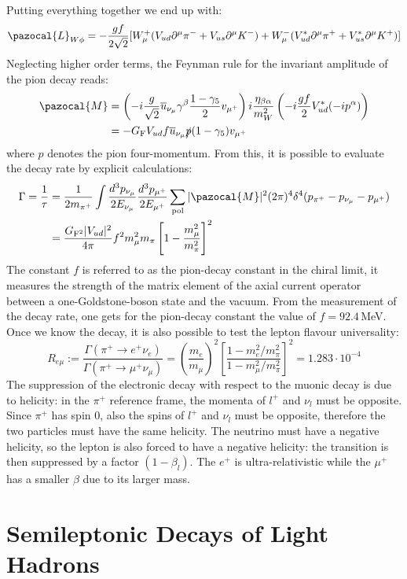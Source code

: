\documentclass[../main.tex]{subfiles}
\begin{document}
Putting everything together we end up with:
\[
\pazocal{L}_{W\phi}=-\frac{gf}{2\sqrt{2}}[W_\mu^+(V_{ud}\partial^\mu\pi^-+V_{us}\partial^\mu K^-)+W_\mu^-(V_{ud}^*\partial^\mu\pi^++V_{us}^*\partial^\mu K^+)]
\]
Neglecting higher order terms, the Feynman rule for the invariant amplitude of the pion decay reads:
\begin{align*}
\pazocal{M}&=\left(-i\frac{g}{\sqrt{2}}\overline{u}_{\nu_\mu}\gamma^\beta\frac{1-\gamma_5}{2}v_{\mu^+}\right)i\frac{\eta_{\beta\alpha}}{m_W^2}\left(-i\frac{gf}{2}V_{ud}^*(-ip^\alpha)\right)\\
&=-G_{\text{F}}V_{ud}f\overline{u}_{\nu_\mu}\slashed{p}(1-\gamma_5)v_{\mu^+}
\end{align*}
where $p$ denotes the pion four-momentum.
From this, it is possible to evaluate the decay rate by explicit calculations:
\begin{align*}
\Gamma=\frac{1}{\tau}&=\frac{1}{2m_{\pi^+}}\int\frac{d^3p_{\nu_\mu}}{2E_{\nu_\mu}}\frac{d^3p_{\mu^+}}{2E_{\mu^+}}\sum_{\text{pol}}|\pazocal{M}|^2(2\pi)^4\delta^4(p_{\pi^+}-p_{\nu_\mu}-p_{\mu^+})\\
&=\frac{G_{\text{F}^2}|V_{ud}|^2}{4\pi}f^2m_\mu^2m_\pi\left[1-\frac{m_\mu^2}{m_\pi^2}\right]^2
\end{align*}
The constant $f$ is referred to as the pion-decay constant in the chiral limit, it measures the strength of the matrix element of the axial current
operator between a one-Goldstone-boson state and the vacuum. From the measurement of the decay rate, one gets for the pion-decay constant the value of $f=92.4$\,MeV.
Once we know the decay, it is also possible to test the lepton flavour universality:
\[
R_{e\mu}:=\frac{\Gamma(\pi^+\to e^+\nu_e)}{\Gamma(\pi^+\to\mu^+\nu_\mu)}=\left(\frac{m_e}{m_\mu}\right)^2\left[\frac{1-m_e^2/m_\pi^2}{1-m_\mu^2/m_\pi^2}\right]^2=1.283\cdot10^{-4}
\]
The suppression of the electronic decay with respect to the muonic decay is due to helicity: in the $\pi^+$ reference frame, the momenta of $l^+$ and $\nu_l$ must be opposite. Since $\pi^+$ has spin 0, also the spins of $l^+$ and $\nu_l$ must be opposite, therefore the two particles must have the same helicity. The neutrino must have a negative helicity, so the lepton is also forced to have a negative helicity: the transition is then suppressed by a factor $(1-\beta_l)$. The $e^+$ is ultra-relativistic while the $\mu^+$ has a smaller $\beta$ due to its larger mass.
\section{Semileptonic Decays of Light Hadrons}
\end{document}
